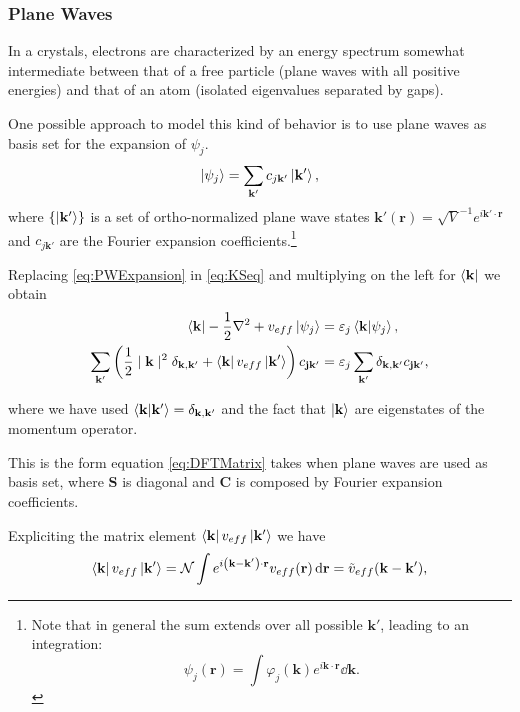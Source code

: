 \documentclass[a4paper,12pt]{article}
\newcommand\mf[1]{\mathbf{#1}}
\newcommand\erre{\mathbf{r}}
\begin{document}
\subsubsection{Plane Waves}
In a crystals, electrons are characterized by an energy spectrum somewhat intermediate between that of a free particle (plane waves with all positive energies) and that of an atom (isolated eigenvalues separated by gaps).

One possible approach to model this kind of behavior is to use plane waves as basis set for the expansion of $\psi_{j}$.
\begin{equation}\label{eq:PWExpansion}
	\ket{\psi_j}  = \sum_{\mf{k}'} c_{j\mf{k}'} \ket{\mf{k}'},
\end{equation}
where $\{\ket{\mf{k}'}\}$ is a set of ortho-normalized plane wave states $\mathbf{k'}(\erre) = \sqrt{V}^{-1} e^{i\mf{k'}\cdot\erre}$ and $c_{j\mf{k}'}$ are the Fourier expansion coefficients.\footnote{Note that in general the sum extends over all possible $\mf{k}'$, leading to an integration:
\begin{equation}
	\psi_j(\erre) = \int \varphi_j(\mf{k}) e^{i\mf{k} \cdot \erre} \dd{\mf{k}}.
\end{equation}
}

Replacing \eqref{eq:PWExpansion} in \eqref{eq:KSeq} and multiplying on the left for $\bra{\mf{k}}$ we obtain \cite{Martin} 
\begin{align}
	\bra{\mf{k}} -\frac{1}{2}\nabla^2 + v_{eff} \ket{\psi_j} &= \varepsilon_j \bra{\mf{k}}\ket{\psi_j},  \\
	\sum_{\mf{k'}} \left( \frac{1}{2}\mid\mf{k}\mid^2  \delta_{\mf{k},\mf{k'}} + \bra{\mf{k}}v_{eff}\ket{\mf{k'}} \right) c_{\mathbf{jk'}} &= \varepsilon_j \sum_{\mf{k'}} \delta_{\mf{k},\mf{k'}} c_{\mathbf{jk'}} \label{eq:SCHFourier},
\end{align}

where we have used $\bra{\mf{k}}\ket{\mf{k'}} = \delta_{\mf{k},\mf{k'}}$ and the fact that $\ket{\mf{k}}$ are eigenstates of the momentum operator.

This is the form equation \eqref{eq:DFTMatrix} takes when plane waves are used as basis set, where $\mathbf{S}$ is diagonal and $\mathbf{C}$ is composed by Fourier expansion coefficients.

Expliciting the matrix element $\bra{\mf{k}} v_{eff} \ket{\mf{k'}}$ we have \cite{Martin} 
\begin{equation}
	\bra{\mf{k}} v_{eff} \ket{\mf{k'}} = \mathcal{N} \int e^{i\left(\mf{k} - \mf{k'} \right) \cdot \erre} v_{eff}(\erre) \dd{\erre} = \tilde{v}_{eff}(\mf{k} - \mf{k'}),
\end{equation}
\end{document}
